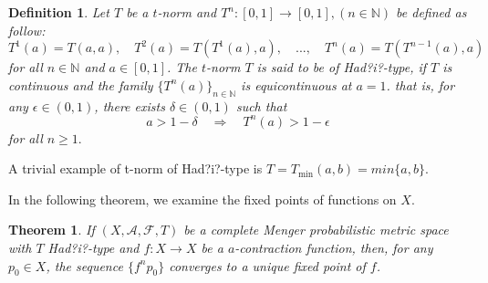\documentclass{amsart}%
\newtheorem{theorem}{Theorem}
\theoremstyle{plain}
\newtheorem{definition}{Definition}
\numberwithin{equation}{section}
\begin{document}
\begin{definition}
	\cite{Hadzic}  Let $T$ be a $t$-norm and $T^n : [0, 1] \to [0, 1],  (n\in \mathbb{N})$ be defined as follow:
	$$T^1(a)=T(a,a), \quad T^2(a)=T(T^1(a),a),\quad ... ,\quad T^n(a)=T(T^{n-1}(a),a)$$
	for all $n\in \mathbb{N}$ and $a\in [0,1]$. The $t$-norm $T$ is said to be of {\em Had?i?-type}, if $T$ is continuous and the family $\{T^n(a)\}_{n\in \mathbb{N}}$ is equicontinuous at $a=1$. that is, for any $\epsilon \in (0,1)$, there exists $\delta\in (0,1)$ such that
	$$a>1-\delta \quad \Rightarrow \quad T^n(a)> 1-\epsilon$$
	for all $n\geq 1.$ 
\end{definition}
A trivial example of t-norm of Had?i?-type is $T = T_{\min}(a, b) = min\{a, b\}.$ 

In the following theorem, we examine the fixed points of functions on $X$.
\begin{theorem}\label{FB1}
	If  $(X,\mathcal{A},\mathcal{F},T)$ be a complete Menger probabilistic metric space with $T$ Had?i?-type and $f: X \to X$ be a $a$-contraction function, then, for any $p_0\in X$, the sequence $\{f^np_{0}\}$
	converges to a unique fixed point of $f$. 
\end{theorem}
\end{document}
